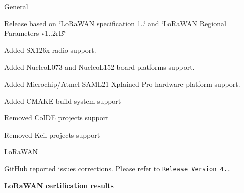 \begin{DoxyItemize}
\item General
\begin{DoxyEnumerate}
\item Release based on \char`\"{}\+Lo\+Ra\+W\+A\+N specification 1..\char`\"{} and \char`\"{}\+Lo\+Ra\+W\+A\+N Regional Parameters v1..\+2r\+B\char`\"{}
\item Added S\+X126x radio support.
\item Added Nucleo\+L073 and Nucleo\+L152 board platforms support.
\item Added Microchip/\+Atmel S\+A\+M\+L21 Xplained Pro hardware platform support.
\item Added C\+M\+A\+KE build system support
\item Removed Co\+I\+DE projects support
\item Removed Keil projects support
\end{DoxyEnumerate}
\item Lo\+Ra\+W\+AN
\begin{DoxyEnumerate}
\item Git\+Hub reported issues corrections. Please refer to \href{https://github.com/Lora-net/LoRaMac-node/milestone/1}{\tt Release Version 4..}
\end{DoxyEnumerate}
\end{DoxyItemize}

{\bfseries Lo\+Ra\+W\+AN certification results}

